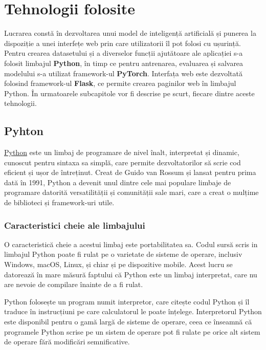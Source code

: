 \chapter{Tehnologii folosite}
\label{Capitolul 4}
Lucrarea constă în dezvoltarea unui model de inteligență artificială și punerea la dispoziție a unei interfețe web prin care utilizatorii îl pot folosi cu ușurință. Pentru crearea datasetului și a diverselor funcții ajutătoare ale aplicației s-a folosit limbajul \textbf{Python}, în timp ce pentru antrenarea, evaluarea și salvarea modelului s-a utilizat framework-ul \textbf{PyTorch}. Interfața web este dezvoltată folosind framework-ul \textbf{Flask}, ce permite crearea paginilor web în limbajul Python. În urmatoarele subcapitole vor fi descrise pe scurt, fiecare dintre aceste tehnologii. 

\section{Pyhton}

\href{https://pytorch.org/}{Python} este un limbaj de programare de nivel înalt, interpretat și dinamic, cunoscut pentru sintaxa sa simplă, care permite dezvoltatorilor să scrie cod eficient și ușor de întreținut. Creat de Guido van Rossum \cite{van1guido} și lansat pentru prima dată în 1991, Python a devenit unul dintre cele mai populare limbaje de programare datorită versatilității și comunității sale mari, care a creat o mulțime de biblioteci și framework-uri utile. 

\subsection{Caracteristici cheie ale limbajului}

O caracteristică cheie a acestui limbaj este portabilitatea sa. Codul sursă scris in limbajul Python poate fi rulat pe o varietate de sisteme de operare, inclusiv Windows, macOS, Linux, și chiar și pe dispozitive mobile. Acest lucru se datorează în mare măsură faptului că Python este un limbaj interpretat, care nu are nevoie de compilare înainte de a fi rulat.

Python folosește un program numit interpretor, care citește codul Python și îl traduce în instrucțiuni pe care calculatorul le poate înțelege. Interpretorul Python este disponibil pentru o gamă largă de sisteme de operare, ceea ce înseamnă că programele Python scrise pe un sistem de operare pot fi rulate pe orice alt sistem de operare fără modificări semnificative.

